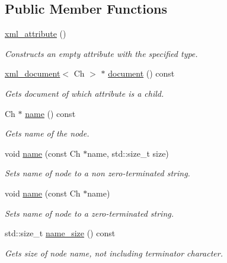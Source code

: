 \subsection*{Public Member Functions}
\begin{DoxyCompactItemize}
\item 
\mbox{\hyperlink{classrapidxml_1_1xml__attribute_ad5464aadf08269a886b730993525db34}{xml\+\_\+attribute}} ()
\begin{DoxyCompactList}\small\item\em Constructs an empty attribute with the specified type. \end{DoxyCompactList}\item 
\mbox{\hyperlink{classrapidxml_1_1xml__document}{xml\+\_\+document}}$<$ Ch $>$ $\ast$ \mbox{\hyperlink{classrapidxml_1_1xml__attribute_ae5396d92d09394b37838f2518f430da4}{document}} () const
\begin{DoxyCompactList}\small\item\em Gets document of which attribute is a child. \end{DoxyCompactList}\item 
Ch $\ast$ \mbox{\hyperlink{classrapidxml_1_1xml__base_af8436e9ee14c127220113eaa956eafee}{name}} () const
\begin{DoxyCompactList}\small\item\em Gets name of the node. \end{DoxyCompactList}\item 
void \mbox{\hyperlink{classrapidxml_1_1xml__base_a4e7e23d06d48126c65b1f6266acfba5c}{name}} (const Ch $\ast$name, std\+::size\+\_\+t size)
\begin{DoxyCompactList}\small\item\em Sets name of node to a non zero-\/terminated string. \end{DoxyCompactList}\item 
void \mbox{\hyperlink{classrapidxml_1_1xml__base_ae099c291e104a0d277307fe71f5e0f9e}{name}} (const Ch $\ast$name)
\begin{DoxyCompactList}\small\item\em Sets name of node to a zero-\/terminated string. \end{DoxyCompactList}\item 
std\+::size\+\_\+t \mbox{\hyperlink{classrapidxml_1_1xml__base_ad01e2eff02202b130baad012d1ed7328}{name\+\_\+size}} () const
\begin{DoxyCompactList}\small\item\em Gets size of node name, not including terminator character. \end{DoxyCompactList}\item 

\end{DoxyCompactItemize}
